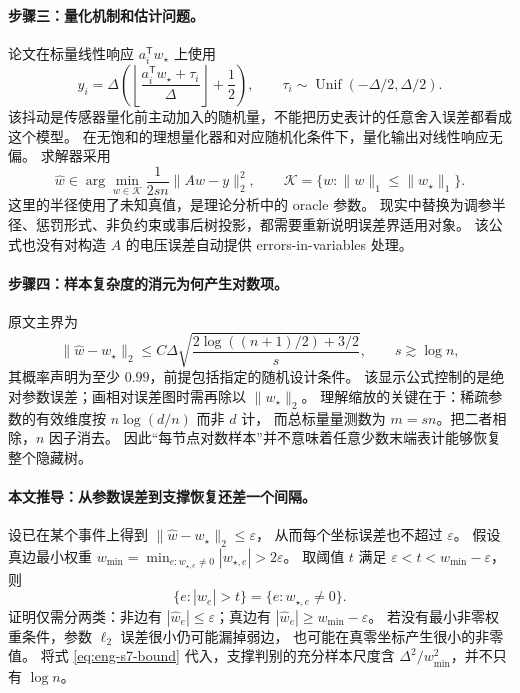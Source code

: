 \documentclass[UTF8,11pt,fontset=fandol]{ctexart}
\theoremstyle{remark}
\numberwithin{equation}{section}
\begin{document}
\paragraph{步骤三：量化机制和估计问题。}
论文在标量线性响应 $a_i^{\mathsf T}w_\star$ 上使用
\begin{equation}
 y_i=\Delta\left(
 \left\lfloor\frac{a_i^{\mathsf T}w_\star+\tau_i}{\Delta}\right\rfloor+\frac12
 \right),\qquad
 \tau_i\sim\operatorname{Unif}(-\Delta/2,\Delta/2).
 \label{eq:eng-s7-quantizer}
\end{equation}
该抖动是传感器量化前主动加入的随机量，不能把历史表计的任意舍入误差都看成这个模型。
在无饱和的理想量化器和对应随机化条件下，量化输出对线性响应无偏。
求解器采用
\begin{equation}
 \widehat w\in\arg\min_{w\in\mathcal K}\frac1{2sn}\|Aw-y\|_2^2,
 \qquad
 \mathcal K=\{w:\|w\|_1\leq\|w_\star\|_1\}.
 \label{eq:eng-s7-lasso}
\end{equation}
这里的半径使用了未知真值，是理论分析中的 oracle 参数。
现实中替换为调参半径、惩罚形式、非负约束或事后树投影，都需要重新说明误差界适用对象。
该公式也没有对构造 $A$ 的电压误差自动提供 errors-in-variables 处理。

\paragraph{步骤四：样本复杂度的消元为何产生对数项。}
原文主界为
\begin{equation}
 \|\widehat w-w_\star\|_2
 \leq C\Delta\sqrt{
 \frac{2\log((n+1)/2)+3/2}{s}},
 \qquad s\gtrsim\log n,
 \label{eq:eng-s7-bound}
\end{equation}
其概率声明为至少 $0.99$，前提包括指定的随机设计条件。
该显示公式控制的是绝对参数误差；画相对误差图时需再除以 $\|w_\star\|_2$。
理解缩放的关键在于：稀疏参数的有效维度按 $n\log(d/n)$ 而非 $d$ 计，
而总标量量测数为 $m=sn$。把二者相除，$n$ 因子消去。
因此“每节点对数样本”并不意味着任意少数末端表计能够恢复整个隐藏树。

\paragraph{本文推导：从参数误差到支撑恢复还差一个间隔。}
设已在某个事件上得到 $\|\widehat w-w_\star\|_2\leq\varepsilon$，
从而每个坐标误差也不超过 $\varepsilon$。
假设真边最小权重
$w_{\min}=\min_{e:w_{\star,e}\neq0}|w_{\star,e}|>2\varepsilon$。
取阈值 $t$ 满足 $\varepsilon<t<w_{\min}-\varepsilon$，则
\begin{equation}
 \{e:|\widehat w_e|>t\}=\{e:w_{\star,e}\neq0\}.
 \label{eq:eng-s7-support}
\end{equation}
证明仅需分两类：非边有 $|\widehat w_e|\leq\varepsilon$；真边有
$|\widehat w_e|\geq w_{\min}-\varepsilon$。
若没有最小非零权重条件，参数 $\ell_2$ 误差很小仍可能漏掉弱边，
也可能在真零坐标产生很小的非零值。
将式 \eqref{eq:eng-s7-bound} 代入，支撑判别的充分样本尺度含
$\Delta^2/w_{\min}^2$，并不只有 $\log n$。
\end{document}
